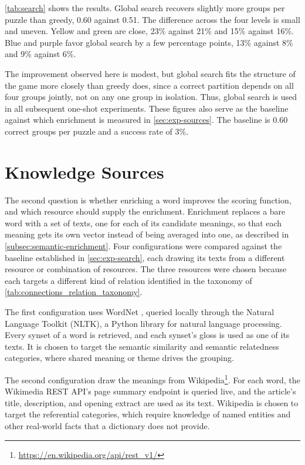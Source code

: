 \autoref{tab:search} shows the results. Global search recovers slightly more groups per puzzle than greedy, 0.60 against 0.51. The difference across the four levels is small and uneven. Yellow and green are close, 23\% against 21\% and 15\% against 16\%. Blue and purple favor global search by a few percentage points, 13\% against 8\% and 9\% against 6\%.

The improvement observed here is modest, but global search fits the structure of the game more closely than greedy does, since a correct partition depends on all four groups jointly, not on any one group in isolation. Thus, global search is used in all subsequent one-shot experiments. These figures also serve as the baseline against which enrichment is measured in \autoref{sec:exp-sources}. The baseline is 0.60 correct groups per puzzle and a success rate of 3\%.

\section{Knowledge Sources}
\label{sec:exp-sources}

The second question is whether enriching a word improves the scoring function, and which resource should supply the enrichment. Enrichment replaces a bare word with a set of texts, one for each of its candidate meanings, so that each meaning gets its own vector instead of being averaged into one, as described in \autoref{subsec:semantic-enrichment}. Four configurations were compared against the baseline established in \autoref{sec:exp-search}, each drawing its texts from a different resource or combination of resources. The three resources were chosen because each targets a different kind of relation identified in the taxonomy of \autoref{tab:connections_relation_taxonomy}.

The first configuration uses WordNet \cite{millerWordNetLexicalDatabase1995}, queried locally through the Natural Language Toolkit (NLTK), a Python library for natural language processing. Every synset of a word is retrieved, and each synset's gloss is used as one of its texts. It is chosen to target the semantic similarity and semantic relatedness categories, where shared meaning or theme drives the grouping.

The second configuration draw the meanings from Wikipedia\footnote{\url{https://en.wikipedia.org/api/rest_v1/}}. For each word, the Wikimedia REST API's page summary endpoint is queried live, and the article's title, description, and opening extract are used as its text. Wikipedia is chosen to target the referential categories, which require knowledge of named entities and other real-world facts that a dictionary does not provide.

